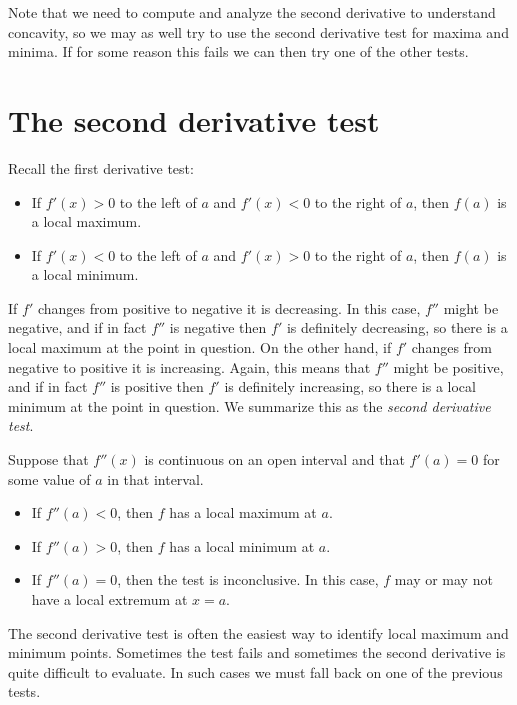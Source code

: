 \documentclass{ximera}
\begin{document}
Note that we need to compute and analyze the second derivative to
understand concavity, so we may as well try to use the second
derivative test for maxima and minima. If for some reason this fails
we can then try one of the other tests.

\section{The second derivative test}


Recall the first derivative test:
\begin{itemize}
\item If $f'(x)>0$ to the left of $a$ and $f'(x)<0$ to the right of
  $a$, then $f(a)$ is a local maximum.
\item If $f'(x)<0$ to the left of $a$ and $f'(x)>0$ to the right of
  $a$, then $f(a)$ is a local minimum.
\end{itemize}

If $f'$ changes from positive to negative it is decreasing. In this
case, $f''$ might be negative, and if in fact $f''$ is negative
then $f'$ is definitely decreasing, so there is a local maximum at
the point in question. On the other hand, if $f'$ changes from
negative to positive it is increasing. Again, this means that
$f''$ might be positive, and if in fact $f''$ is positive then
$f'$ is definitely increasing, so there is a local minimum at the
point in question. We summarize this as the \textit{second derivative
  test}.

\begin{theorem}\label{T:sdt}
Suppose that $f''(x)$ is continuous on an open interval and that
$f'(a)=0$ for some value of $a$ in that interval.
\begin{itemize}
\item If $f''(a) <0$, then $f$ has a local maximum at $a$.
\item If $f''(a) >0$, then $f$ has a local minimum at $a$.
\item If $f''(a) =0$, then the test is inconclusive. In this case,
  $f$ may or may not have a local extremum at $x=a$.
\end{itemize}
\end{theorem}


The second derivative test is often the easiest way to identify local
maximum and minimum points. Sometimes the test fails and sometimes
the second derivative is quite difficult to evaluate. In such cases we
must fall back on one of the previous tests.
\end{document}
